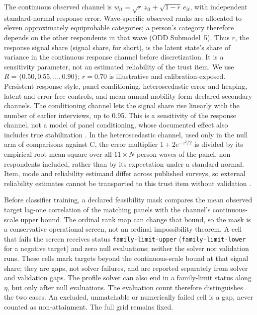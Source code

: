The continuous observed channel is $w_{it}=\sqrt r\,z_{it}+\sqrt{1-r}\,e_{it}$, with independent standard-normal response error. %
Wave-specific observed ranks are allocated to eleven approximately equiprobable categories; a person's category therefore depends on the other respondents in that wave (ODD Submodel~5). %
Thus $r$, the response signal share (signal share, for short), is the latent state's share of variance in the continuous response channel before discretization. It is a sensitivity parameter, not an estimated reliability of the trust item. %
We use $R=\{0.50,0.55,\ldots,0.90\}$; $r=0.70$ is illustrative and calibration-exposed. %
Persistent response style, panel conditioning, heteroscedastic error and heaping, latent and error-free controls, and mean annual mobility form declared secondary channels. %
The conditioning channel lets the signal share rise linearly with the number of earlier interviews, up to 0.95. This is a sensitivity of the response channel, not a model of panel conditioning, whose documented effect also includes true stabilization \cite{kraemer2025}. %
In the heteroscedastic channel, used only in the null arm of comparisons against C, the error multiplier $1+2e^{-z^2/2}$ is divided by its empirical root mean square over all $11\times N$ person-waves of the panel, non-respondents included, rather than by its expectation under a standard normal. %
Item, mode and reliability estimand differ across published surveys, so external reliability estimates cannot be transported to this trust item without validation \cite{antoun2026,lucasdonnellan2012}. %

Before classifier training, a declared feasibility mask compares the mean observed target lag-one correlation of the matching panels with the channel's continuous-scale upper bound. %
The ordinal rank map can change that bound, so the mask is a conservative operational screen, not an ordinal impossibility theorem. %
A cell that fails the screen receives status \texttt{family-limit-upper} (\texttt{family-limit-lower} for a negative target) and zero null evaluations; neither the solver nor validation runs. %
These cells mark targets beyond the continuous-scale bound at that signal share; they are gaps, not solver failures, and are reported separately from solver and validation gaps. %
The profile solver can also end in a family-limit status along $\eta$, but only after null evaluations. The evaluation count therefore distinguishes the two cases. %
An excluded, unmatchable or numerically failed cell is a gap, never counted as non-attainment. %
The full grid remains fixed. %

